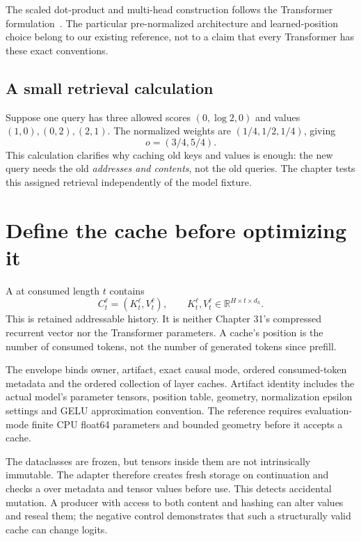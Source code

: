 The scaled dot-product and multi-head construction follows the Transformer
formulation~\cite{vaswani}. The particular pre-normalized architecture and
learned-position choice belong to our existing reference, not to a claim that
every Transformer has these exact conventions.

\subsection{A small retrieval calculation}
Suppose one query has three allowed scores $(0,\log2,0)$ and values
$(1,0),(0,2),(2,1)$. The normalized weights are $(1/4,1/2,1/4)$, giving
\[
 o=(3/4,5/4).
\]
This calculation clarifies why caching old keys and values is enough:
the new query needs the old \emph{addresses and contents}, not the old queries.
The chapter tests this assigned retrieval independently of the model fixture.

\section{Define the cache before optimizing it}
\label{evod35:cache}
A  at consumed length $t$ contains
\[
 C_t^\ell=(K_t^\ell,V_t^\ell),\qquad
 K_t^\ell,V_t^\ell\in\mathbb R^{H\times t\times d_h}.
\]
This is retained addressable history. It is neither Chapter 31's compressed
recurrent vector nor the Transformer parameters. A cache's position is the
number of consumed tokens, not the number of generated tokens since prefill.

The envelope binds owner, artifact, exact causal mode, ordered consumed-token
metadata and the ordered collection of layer caches. Artifact identity includes
the actual model's parameter tensors, position table, geometry,
normalization epsilon settings and GELU approximation convention.
The reference requires evaluation-mode finite CPU float64 parameters and
bounded geometry before it accepts a cache.


The dataclasses are frozen, but tensors inside them are not intrinsically
immutable. The adapter therefore creates fresh storage on continuation and
checks a  over metadata and tensor values before
use. This detects accidental mutation. A producer with access to both content
and hashing can alter values and reseal them; the negative control demonstrates
that such a structurally valid cache can change logits.

